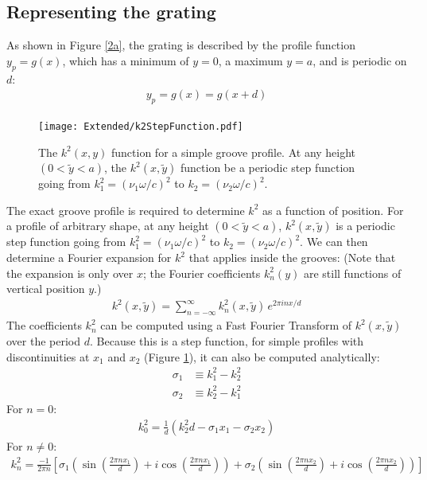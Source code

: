\subsection{Representing the grating}

As shown in Figure \ref{2a}, the grating is described by the profile function $y_p = g(x)$, which has a minimum of $y=0$, a maximum $y=a$, and is periodic on $d$:
\begin{align}
y_p = g(x) = g(x+d)
\end{align}
\label{k2Expansion}

\begin{figure}[htbp] %
   \centering
   \texttt{[image: Extended/k2StepFunction.pdf]} 
   \caption[The $k^2(x, y)$ function for a simple groove profile.]{The $k^2(x, y)$ function for a simple groove profile. At any height $(0<\tilde y<a)$, the $k^2(x, \tilde y)$ function be a periodic step function going from $k^2_1=(\nu_1 \omega/c)^2$ to $k_2 = (\nu_2 \omega/c)^2$. }
   \label{k2StepFn}
\end{figure}

The exact groove profile is required to determine $k^2$ as a function of position. For a profile of arbitrary shape, at any height $(0<\tilde y<a)$, $k^2(x, \tilde y)$ is a periodic step function going from $k^2_1=(\nu_1 \omega/c)^2$ to $k_2 = (\nu_2 \omega/c)^2$.  We can then determine a Fourier expansion for $k^2$ that applies inside the grooves:  (Note that the expansion is only over $x$; the Fourier coefficients $k^2_n(y)$ are still functions of vertical position $y$.)
\begin{align}
\label{k2FourierExpansion}
k^2(x,\tilde y) = \sum \limits_{n=-\infty}^{\infty} k^2_n(x, \tilde y)\, e^{2\pi i n x/d}
\end{align}
The coefficients $k^2_n$ can be computed using a Fast Fourier Transform of $k^2(x,\tilde y)$ over the period $d$.  Because this is a step function, for simple profiles with discontinuities at $x_1$ and $x_2$ (Figure \ref{k2StepFn}), it can also be computed analytically:
\begin{align}
\sigma_1 &\equiv  k_1^2 - k_2^2 \\
\sigma_2 &\equiv k_2^2 - k_1^2
\end{align}
For $n=0$:
\begin{align}
k^2_0 = \frac{1}{d} \left( k_2^2d - \sigma_1 x_1 - \sigma_2 x_2 \right)
\end{align}
For $n\neq0$:
\begin{align}
k^2_n= \frac{-1}{2 \pi n} \left[ \sigma_1 \left( \sin \left(\frac{2\pi n x_1}{d}\right) + i \cos \left(\frac{2\pi n x_1}{d}\right) \right) +  \sigma_2 \left( \sin \left(\frac{2\pi n x_2}{d}\right) + i \cos \left(\frac{2\pi n x_2}{d}\right) \right) \right]
\end{align}

